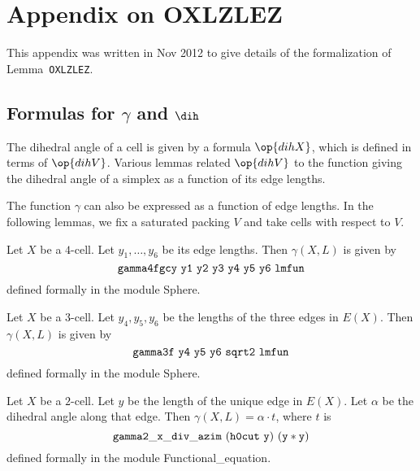 

\def\bve{{\underline {\hat\u}}}
\def\ke{ k_{\mathbf e}}
\def\pe{{ {\mathbf p}}_{\mathbf e}}
\def\cX{{\mathcal X}}
\def\gg{\check\gamma}
\def\QX{\op{QX}}
\def\QY{\op{QY}}
\def\QU{\op{QU}}
\def\eps{\epsilon}

\newpage
\section{Appendix on OXLZLEZ}\label{sec:oxl}

This appendix was written in Nov 2012 to give details of the formalization of Lemma~{\tt OXLZLEZ}.

\subsection{Formulas for $\gamma$ and $\dih$}

The dihedral angle of a cell is given by a formula $\op{dihX}$, which is defined in terms
of $\op{dihV}$.  Various lemmas related $\op{dihV}$ to the function giving the dihedral
angle of a simplex as a function of its edge lengths.

The function $\gamma$ can also be expressed as a function of edge lengths.
In the following lemmas, we fix a saturated packing $V$ and take cells with respect to $V$.


\begin{lemma} Let $X$ be a $4$-cell.  Let $y_1,\ldots,y_6$ be its edge lengths.  
Then $\gamma(X,L)$  is given by 
\[
{\tt gamma4fgcy~y1~y2~y3~y4~y5~y6~lmfun}
\]
defined formally in the module Sphere.
\end{lemma}

\begin{lemma} Let $X$ be a $3$-cell.  Let $y_4,y_5,y_6$ be the lengths of the three edges
in $E(X)$.  Then $\gamma(X,L)$ is given by
\[
{\tt gamma3f~y4~y5~y6~sqrt2~lmfun}
\]
defined formally in the module Sphere.
\end{lemma}

\begin{lemma} Let $X$ be a $2$-cell.  Let $y$ be the length of the unique edge in $E(X)$.
Let $\alpha$ be the dihedral angle along that edge.
Then $\gamma(X,L)=\alpha\cdot t$, where $t$ is
\[
{\tt
gamma2\_x\_div\_azim~(h0cut~y)~(y*y)
}
\]
defined formally in the module Functional\_equation.
\end{lemma}

